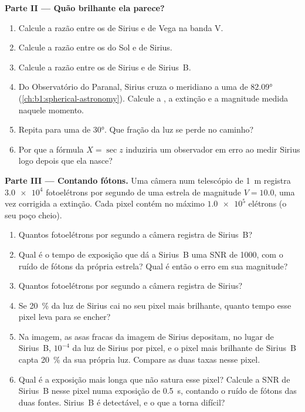 \begin{problem}
\medskip
\noindent\textbf{Parte II --- Quão brilhante ela parece?}
\begin{enumerate}[resume]
  \item Calcule a razão entre os  de Sirius e de Vega na banda V.
  \item Calcule a razão entre os  do Sol e de Sirius.
  \item Calcule a razão entre os  de Sirius e de Sirius~B.
  \item Do Observatório do Paranal, Sirius cruza o meridiano a uma  de \ang{82.09} (\cref{ch:b1:spherical-astronomy}). Calcule a , a extinção e a magnitude medida naquele momento.
  \item Repita para uma  de \ang{30}. Que fração da luz se perde no caminho?
  \item Por que a fórmula $X = \sec z$ induziria um observador em erro ao medir Sirius logo depois que ela nasce?
\end{enumerate}

\medskip
\noindent\textbf{Parte III --- Contando fótons.}
Uma câmera num telescópio de \qty{1}{m} registra $\num{3.0e4}$ fotoelétrons por segundo de uma estrela de magnitude $V = 10.0$, uma vez corrigida a extinção. Cada pixel contém no máximo $\num{1.0e5}$ elétrons (o seu poço cheio).
\begin{enumerate}[resume]
  \item Quantos fotoelétrons por segundo a câmera registra de Sirius~B?
  \item Qual é o tempo de exposição que dá a Sirius~B uma SNR de 1000, com o ruído de fótons da própria estrela? Qual é então o erro em sua magnitude?
  \item Quantos fotoelétrons por segundo a câmera registra de Sirius?
  \item Se \qty{20}{\percent} da luz de Sirius cai no seu pixel mais brilhante, quanto tempo esse pixel leva para se encher?
  \item Na imagem, as asas fracas da imagem de Sirius depositam, no lugar de Sirius~B, $10^{-4}$ da luz de Sirius por pixel, e o pixel mais brilhante de Sirius~B capta \qty{20}{\percent} da sua própria luz. Compare as duas taxas nesse pixel.
  \item Qual é a exposição mais longa que não satura esse pixel? Calcule a SNR de Sirius~B nesse pixel numa exposição de \qty{0.5}{s}, contando o ruído de fótons das duas fontes. Sirius~B é detectável, e o que a torna difícil?
\end{enumerate}


\end{problem}
